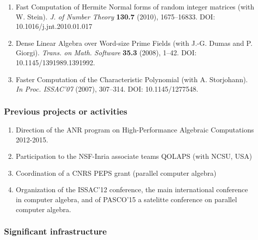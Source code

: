 \begin{description}
\begin{enumerate}[1.]
\item Fast Computation of Hermite Normal forms of random integer matrices (with
W. Stein).
\emph{J. of Number Theory} {\bf{130.7}} (2010), 1675--16833. DOI: 10.1016/j.jnt.2010.01.017

\item Dense Linear Algebra over Word-size Prime Fields (with J.-G. Dumas and P. Giorgi). 
\emph{Trans. on Math. Software} {\bf{35.3}} (2008), 1--42. DOI: 10.1145/1391989.1391992.

\item Faster Computation of the Characteristic Polynomial (with A. Storjohann). 
\emph{In Proc. ISSAC'07}  (2007), 307--314. DOI: 10.1145/1277548.
\end{enumerate}

\end{description}

\subsubsection*{Previous projects or activities}

\begin{enumerate}
\item Direction of the ANR program on High-Performance Algebraic
  Computations 2012-2015.
\item Participation to the NSF-Inria associate teams QOLAPS (with NCSU, USA)
\item Coordination of a CNRS PEPS grant (parallel computer algebra)
\item Organization of the ISSAC'12 conference, the main
  international conference in computer algebra, and of PASCO'15 a satelitte
  conference on parallel computer algebra.
\end{enumerate}

\subsubsection*{Significant infrastructure}

